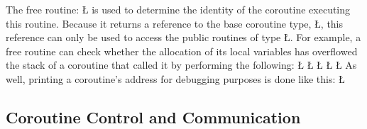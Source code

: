 \documentclass[openright,twoside]{report}
\begin{document}
The free routine:
\LGinlinefalse\LGbegin\lgrinde
\L{}
\endlgrinde\LGend
{}%
is used to determine the identity of the coroutine executing this routine.
Because it returns a reference to the base coroutine type, \LGinlinetrue\LGbegin\lgrinde\L{}\endlgrinde\LGend{}, this reference can only be used to access the public routines of type \LGinlinetrue\LGbegin\lgrinde\L{}\endlgrinde\LGend{}.
For example, a free routine can check whether the allocation of its local variables has overflowed the stack of a coroutine that called it by performing the following:
\LGinlinefalse\LGbegin\lgrinde
\L{}
\L{\LB{}}
\CE{}\L{\LB{}}
\CE{}\L{\LB{}}
\CE{}\L{\LB{\}}}
\endlgrinde\LGend
As well, printing a coroutine's address for debugging purposes is done like this:
\LGinlinefalse\LGbegin\lgrinde
\L{}
\CE{}\endlgrinde\LGend


\subsection{Coroutine Control and Communication}
\label{s:CoroutineControlCommunication}
\end{document}
